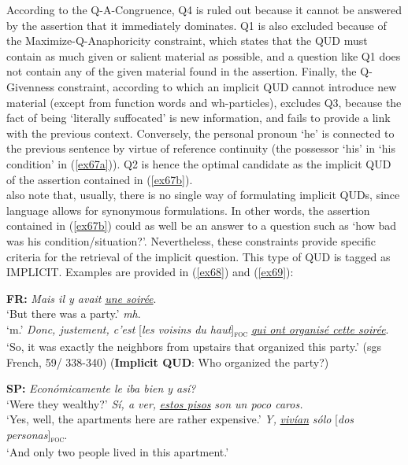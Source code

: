 \begin{description}
According to the Q-A-Congruence, Q4 is ruled out because it cannot be answered by the assertion that it immediately dominates. Q1 is also excluded because of the Maximize-Q-Anaphoricity constraint, which states that the QUD must contain as much given or salient material as possible, and a question like Q1 does not contain any of the given material found in the assertion. Finally, the Q-Givenness constraint, according to which an implicit QUD cannot introduce new material (except from function words and wh-particles), excludes Q3, because the fact of being ‘literally suffocated’ is new information, and fails to provide a link with the previous context. Conversely, the personal pronoun ‘he’ is connected to the previous sentence by virtue of reference continuity (the possessor 
`his' in ‘his condition' in (\ref{ex67a})). Q2 is hence the optimal candidate as the implicit QUD of the assertion contained in (\ref{ex67b}).\\
\textcite{riester2018annotation, riester2019constructing} also note that, usually, there is no single way of formulating implicit QUDs, since language allows for synonymous formulations. In other words, the assertion contained in (\ref{ex67b}) could as well be an answer to a question such as ‘how bad was his condition/situation?’. Nevertheless, these constraints provide specific criteria for the retrieval of the implicit question. This type of QUD is tagged as {\selectfont IMPLICIT}. Examples are provided in (\ref{ex68}) and (\ref{ex69}):

\ea \label{ex68} \textbf{FR:}
\ea \textit{Mais il y avait} \uline{\textit{une soirée}}.\\
`But there was a party.'
\ex \textit{mh}.\\
`m.'
 \textit{Donc, justement, c'est} {[\textit{les voisins du haut}]\textsubscript{\textsc{foc}}} \normalsize \uline{\textit{qui ont organisé cette soirée}}.\\
`So, it was exactly the neighbors from upstairs that organized this party.' \hfill (sgs French, 59/ 338-340)    
\z \z 
\hfill (\textbf{Implicit QUD}: Who organized the party?)

\ea \label{ex69} \textbf{SP:}
\ea \textit{Económicamente le iba bien y así?}\\  
`Were they wealthy?'
\ex \textit{Sí, a ver,} \uline{\textit{estos pisos}} \textit{son un poco caros.}\\
`Yes, well, the apartments here are rather expensive.'
 \textit{Y,} \uline{\textit{vivían}} \textit{sólo} {[\textit{dos personas}]\textsubscript{\textsc{foc}}}\normalsize.\\
`And only two people lived in this apartment.' 


\end{description}
